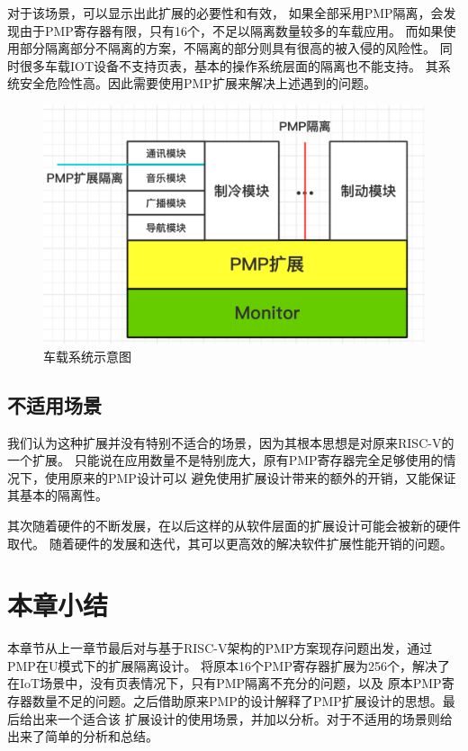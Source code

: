 对于该场景，可以显示出此扩展的必要性和有效，
如果全部采用PMP隔离，会发现由于PMP寄存器有限，只有16个，不足以隔离数量较多的车载应用。
而如果使用部分隔离部分不隔离的方案，不隔离的部分则具有很高的被入侵的风险性。
同时很多车载IOT设备不支持页表，基本的操作系统层面的隔离也不能支持。
其系统安全危险性高。因此需要使用PMP扩展来解决上述遇到的问题。
\begin{figure}
    \centering
    \includegraphics[scale=0.45]{Figures/extend/car.png}
    \decoRule
    \caption{车载系统示意图}
    \label{fig:car}
\end{figure}

\subsection{不适用场景}
我们认为这种扩展并没有特别不适合的场景，因为其根本思想是对原来RISC-V的一个扩展。
只能说在应用数量不是特别庞大，原有PMP寄存器完全足够使用的情况下，使用原来的PMP设计可以
避免使用扩展设计带来的额外的开销，又能保证其基本的隔离性。

其次随着硬件的不断发展，在以后这样的从软件层面的扩展设计可能会被新的硬件取代。
随着硬件的发展和迭代，其可以更高效的解决软件扩展性能开销的问题。

\section{本章小结}
本章节从上一章节最后对与基于RISC-V架构的PMP方案现存问题出发，通过PMP在U模式下的扩展隔离设计。
将原本16个PMP寄存器扩展为256个，解决了在IoT场景中，没有页表情况下，只有PMP隔离不充分的问题，以及
原本PMP寄存器数量不足的问题。之后借助原来PMP的设计解释了PMP扩展设计的思想。最后给出来一个适合该
扩展设计的使用场景，并加以分析。对于不适用的场景则给出来了简单的分析和总结。